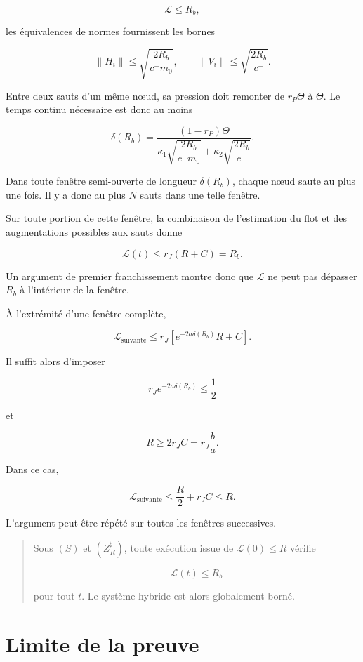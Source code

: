 \[
\mathcal L\leq R_b,
\]

les équivalences de normes fournissent les bornes

\[
\|H_i\|
\leq
\sqrt{\frac{2R_b}{c^-m_0}},
\qquad
\|V_i\|
\leq
\sqrt{\frac{2R_b}{c^-}}.
\]

Entre deux sauts d'un même nœud, sa pression doit remonter de
\(r_P\Theta\) à \(\Theta\). Le temps continu nécessaire est donc
au moins

\[
\delta(R_b)
=
\frac{(1-r_P)\Theta}
{
\kappa_1
\sqrt{\dfrac{2R_b}{c^-m_0}}
+
\kappa_2
\sqrt{\dfrac{2R_b}{c^-}}
}.
\]

Dans toute fenêtre semi-ouverte de longueur \(\delta(R_b)\), chaque
nœud saute au plus une fois. Il y a donc au plus \(N\) sauts dans
une telle fenêtre.

Sur toute portion de cette fenêtre, la combinaison de l'estimation
du flot et des augmentations possibles aux sauts donne

\[
\mathcal L(t)
\leq
r_J(R+C)
=
R_b.
\]

Un argument de premier franchissement montre donc que
\(\mathcal L\) ne peut pas dépasser \(R_b\) à l'intérieur de la
fenêtre.

À l'extrémité d'une fenêtre complète,

\[
\mathcal L_{\mathrm{suivante}}
\leq
r_J
\left[
e^{-2a\delta(R_b)}R+C
\right].
\]

Il suffit alors d'imposer

\[
\boxed{
r_J e^{-2a\delta(R_b)}
\leq
\frac12
}
\]

et

\[
\boxed{
R
\geq
2r_JC
=
r_J\frac{b}{a}.
}
\tag{\(Z_R^\sharp\)}
\]

Dans ce cas,

\[
\mathcal L_{\mathrm{suivante}}
\leq
\frac{R}{2}+r_JC
\leq R.
\]

L'argument peut être répété sur toutes les fenêtres successives.

\begin{quote}
Sous \((S)\) et \((Z_R^\sharp)\), toute exécution issue de
\(\mathcal L(0)\leq R\) vérifie

\[
\mathcal L(t)\leq R_b
\]

pour tout \(t\). Le système hybride est alors globalement borné.
\end{quote}

\section{Limite de la preuve}\label{t1-limite-de-la-preuve}

